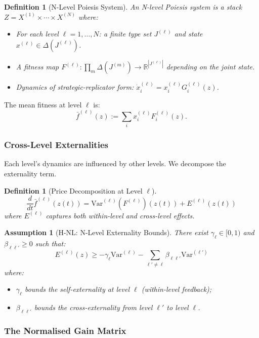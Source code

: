 \documentclass[12pt]{article}
\newtheorem{definition}[theorem]{Definition}
\newtheorem{assumption}[theorem]{Assumption}
\newcommand{\R}{\mathbb{R}}
\newcommand{\Var}{\mathrm{Var}}
\begin{document}
\begin{definition}[N-Level Poiesis System]
An \emph{N-level Poiesis system} is a stack $Z = X^{(1)} \times \cdots \times X^{(N)}$ where:
\begin{itemize}
    \item For each level $\ell = 1, \ldots, N$: a finite type set $J^{(\ell)}$ and state $x^{(\ell)} \in \Delta(J^{(\ell)})$.
    \item A fitness map $F^{(\ell)}: \prod_m \Delta(J^{(m)}) \to \R^{|J^{(\ell)}|}$ depending on the joint state.
    \item Dynamics of strategic-replicator form: $\dot{x}^{(\ell)}_i = x^{(\ell)}_i G^{(\ell)}_i(z)$.
\end{itemize}
\end{definition}

The mean fitness at level $\ell$ is:
\[
\bar{f}^{(\ell)}(z) := \sum_i x^{(\ell)}_i F^{(\ell)}_i(z).
\]

\subsubsection{Cross-Level Externalities}

Each level's dynamics are influenced by other levels. We decompose the externality term.

\begin{definition}[Price Decomposition at Level $\ell$]
\[
\frac{d}{dt} \bar{f}^{(\ell)}(z(t)) = \Var^{(\ell)}(F^{(\ell)})(z(t)) + E^{(\ell)}(z(t))
\]
where $E^{(\ell)}$ captures both within-level and cross-level effects.
\end{definition}

\begin{assumption}[H-NL: N-Level Externality Bounds]
\label{ass:h-nl}
There exist $\gamma_\ell \in [0, 1)$ and $\beta_{\ell\ell'} \geq 0$ such that:
\[
E^{(\ell)}(z) \geq -\gamma_\ell \Var^{(\ell)} - \sum_{\ell' \neq \ell} \beta_{\ell\ell'} \Var^{(\ell')}
\]
where:
\begin{itemize}
    \item $\gamma_\ell$ bounds the self-externality at level $\ell$ (within-level feedback);
    \item $\beta_{\ell\ell'}$ bounds the cross-externality from level $\ell'$ to level $\ell$.
\end{itemize}
\end{assumption}

\subsubsection{The Normalised Gain Matrix}
\end{document}
